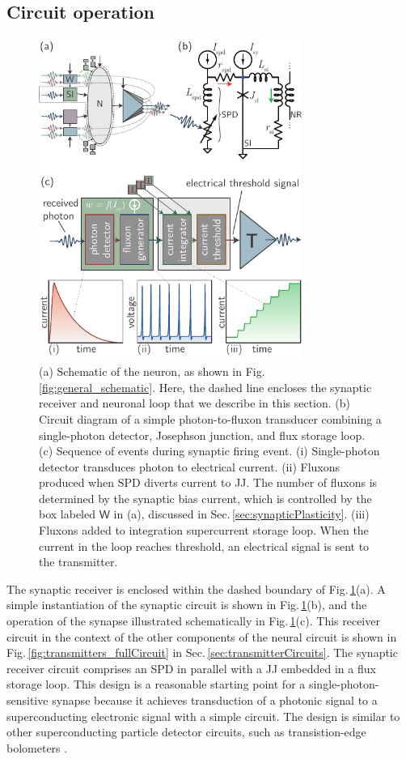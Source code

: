 \documentclass[aip,amsmath,amssymb,reprint,nofootinbib]{revtex4-1}
\begin{document}
\subsection{\label{sec:circuitOperation}Circuit operation}
\begin{figure}[t!]
	\centerline{\includegraphics[width=8.6cm]{_receivers_schematic_small.pdf}}
	\caption{\label{fig:receivers_schematic}(a) Schematic of the neuron, as shown in Fig.\,\ref{fig:general_schematic}. Here, the dashed line encloses the synaptic receiver and neuronal loop that we describe in this section. (b) Circuit diagram of a simple photon-to-fluxon transducer combining a single-photon detector, Josephson junction, and flux storage loop. (c) Sequence of events during synaptic firing event. (i) Single-photon detector transduces photon to electrical current. (ii) Fluxons produced when SPD diverts current to JJ. The number of fluxons is determined by the synaptic bias current, which is controlled by the box labeled $\mathsf{W}$ in (a), discussed in Sec.\,\ref{sec:synapticPlasticity}. (iii) Fluxons added to integration supercurrent storage loop. When the current in the loop reaches threshold, an electrical signal is sent to the transmitter.}
\end{figure}
The synaptic receiver is enclosed within the dashed boundary of Fig.\,\ref{fig:receivers_schematic}(a). A simple instantiation of the synaptic circuit is shown in Fig.\,\ref{fig:receivers_schematic}(b), and the operation of the synapse illustrated schematically in Fig.\,\ref{fig:receivers_schematic}(c). This receiver circuit in the context of the other components of the neural circuit is shown in Fig.\,\ref{fig:transmitters_fullCircuit} in Sec.\,\ref{sec:transmitterCircuits}. The synaptic receiver circuit comprises an SPD in parallel with a JJ embedded in a flux storage loop. This design is a reasonable starting point for a single-photon-sensitive synapse because it achieves transduction of a photonic signal to a superconducting electronic signal with a simple circuit. The design is similar to other superconducting particle detector circuits, such as transistion-edge bolometers \cite{vatu1998}. 
\end{document}
